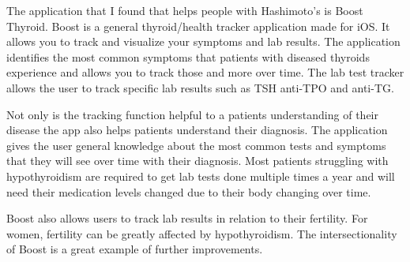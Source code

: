 \documentclass{article}
\begin{document}
The application that I found that helps people with Hashimoto's is Boost Thyroid. Boost is a general thyroid/health tracker application made for iOS. It allows you to track and visualize your symptoms and lab results. The application identifies the most common symptoms that patients with diseased thyroids experience and allows you to track those and more over time. The lab test tracker allows the user to track specific lab results such as TSH anti-TPO and anti-TG.

Not only is the tracking function helpful to a patients understanding of their disease the app also helps patients understand their diagnosis.  The application gives the user general knowledge about the most common tests and symptoms that they will see over time with their diagnosis. Most patients struggling with hypothyroidism are required to get lab tests done multiple times a year and will need their medication levels changed due to their body changing over time. 

Boost also allows users to track lab results in relation to their fertility. For women, fertility can be greatly affected by hypothyroidism. The intersectionality of Boost is a great example of further improvements. \citep{boost}
\end{document}
